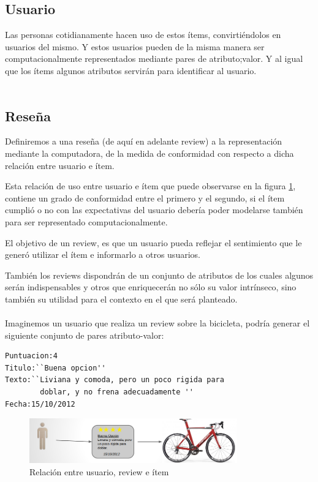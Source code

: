 \subsection{Usuario}
Las personas cotidianamente hacen uso de estos ítems, convirtiéndolos en usuarios del mismo. Y estos usuarios pueden de la misma manera ser computacionalmente representados mediante pares de atributo;valor. Y al igual que los ítems algunos atributos servirán para identificar al usuario. 
\\\\
\subsection{Reseña}
Definiremos a una reseña (de aquí en adelante review) a la representación mediante la computadora, de la medida de conformidad con respecto a dicha relación entre usuario e ítem. 

Esta relación de uso entre usuario e ítem que puede observarse en la figura \ref{figure:reviewItemUser}, contiene un grado de conformidad entre el primero y el segundo, si el ítem cumplió o no con las expectativas del usuario debería poder modelarse también para ser representado computacionalmente.

El objetivo de un review, es que un usuario pueda reflejar el sentimiento que le generó utilizar el ítem e informarlo a otros usuarios. 

También los reviews dispondrán de un conjunto de atributos de los cuales algunos serán indispensables y otros que enriquecerán no sólo su valor intrínseco, sino también su utilidad para el contexto en el que será planteado.
\\\\
Imaginemos un usuario que realiza un review sobre la bicicleta, podría generar el siguiente conjunto de pares atributo-valor:
\begin{lstlisting}[frame=single] 
Puntuacion:4 
Titulo:``Buena opcion''
Texto:``Liviana y comoda, pero un poco rigida para 
        doblar, y no frena adecuadamente ''
Fecha:15/10/2012
\end{lstlisting}
\begin{figure}
    \centering
    \includegraphics[width=0.8\textwidth,natwidth=610,natheight=642]{biciReview.png}
    \caption{Relación entre usuario, review e ítem}
    \label{figure:reviewItemUser}
\end{figure}

